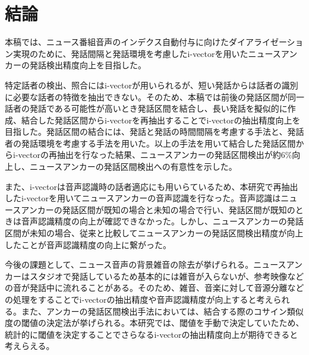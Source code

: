\chapter{結論}
本稿では、ニュース番組音声のインデクス自動付与に向けたダイアライゼーション実現のために、発話間隔と発話環境を考慮したi-vectorを用いたニュースアンカーの発話検出精度向上を目指した。\par
特定話者の検出、照合にはi-vectorが用いられるが、短い発話からは話者の識別に必要な話者の特徴を抽出できない。そのため、本稿では前後の発話区間が同一話者の発話である可能性が高いとき発話区間を結合し、長い発話を擬似的に作成、結合した発話区間からi-vectorを再抽出することでi-vectorの抽出精度向上を目指した。発話区間の結合には、発話と発話の時間間隔を考慮する手法と、発話者の発話環境を考慮する手法を用いた。以上の手法を用いて結合した発話区間からi-vectorの再抽出を行なった結果、ニュースアンカーの発話区間検出が約6\%向上し、ニュースアンカーの発話区間検出への有意性を示した。\par
また、i-vectorは音声認識時の話者適応にも用いらているため、本研究で再抽出したi-vectorを用いてニュースアンカーの音声認識を行なった。音声認識はニュースアンカーの発話区間が既知の場合と未知の場合で行い、発話区間が既知のときは音声認識精度の向上が確認できなかった。しかし、ニュースアンカーの発話区間が未知の場合、従来と比較してニュースアンカーの発話区間検出精度が向上したことが音声認識精度の向上に繋がった。\par
今後の課題として、ニュース音声の背景雑音の除去が挙げられる。ニュースアンカーはスタジオで発話しているため基本的には雑音が入らないが、参考映像などの音が発話中に流れることがある。そのため、雑音、音楽に対して音源分離などの処理をすることでi-vectorの抽出精度や音声認識精度が向上すると考えられる。また、アンカーの発話区間検出手法においては、結合する際のコサイン類似度の閾値の決定法が挙げられる。本研究では、閾値を手動で決定していたため、統計的に閾値を決定することでさらなるi-vectorの抽出精度向上が期待できると考えらえる。